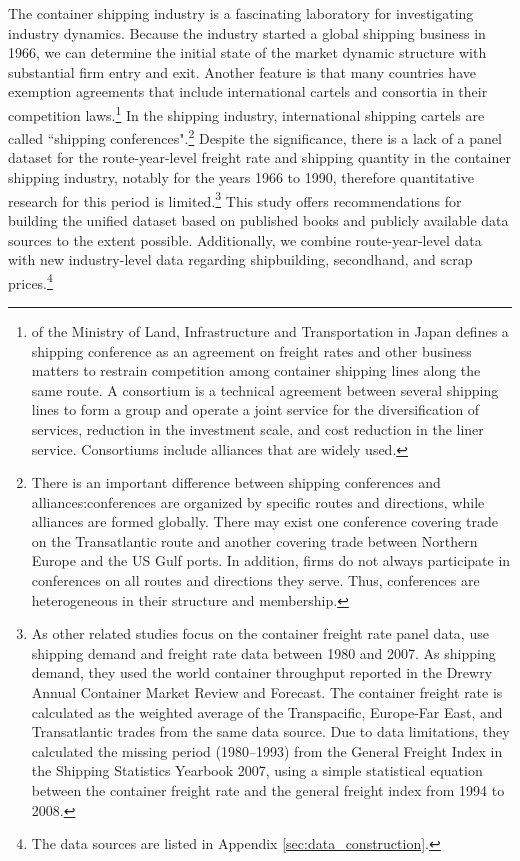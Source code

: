 \documentclass[11pt]{article}
\begin{document}
The container shipping industry is a fascinating laboratory for investigating industry dynamics. Because the industry started a global shipping business in 1966, we can determine the initial state of the market dynamic structure with substantial firm entry and exit. Another feature is that many countries have exemption agreements that include international cartels and consortia in their competition laws.\footnote{\cite{Anteitekina_kokusaikaijouyusoukakuhonotameno_kaijiseisakuno_arikatanitsuite2007} of the Ministry of Land, Infrastructure and Transportation in Japan defines a shipping conference as an agreement on freight rates and other business matters to restrain competition among container shipping lines along the same route. A consortium is a technical agreement between several shipping lines to form a group and operate a joint service for the diversification of services, reduction in the investment scale, and cost reduction in the liner service. Consortiums include alliances that are widely used. } In the shipping industry, international shipping cartels are called  ``shipping conferences".\footnote{There is an important difference between shipping conferences and alliances:conferences are organized by specific routes and directions, while alliances are formed globally. There may exist one conference covering trade on the Transatlantic route and another covering trade between Northern Europe and the US Gulf ports. In addition, firms do not always participate in conferences on all routes and directions they serve. Thus, conferences are heterogeneous in their structure and membership.} Despite the significance, there is a lack of a panel dataset for the route-year-level freight rate and shipping quantity in the container shipping industry, notably for the years 1966 to 1990, therefore  quantitative research for this period is limited.\footnote{As other related studies focus on the container freight rate panel data, \cite{luo2009econometric} use shipping demand and freight rate data between 1980 and 2007. As shipping demand, they used the world container throughput reported in the Drewry Annual Container Market Review and Forecast. The container freight rate is calculated as the weighted average of the Transpacific, Europe-Far East, and Transatlantic trades from the same data source. Due to data limitations, they calculated the missing period (1980–1993) from the General Freight Index in the Shipping Statistics Yearbook 2007, using a simple statistical equation between the container freight rate and the general freight index from 1994 to 2008.} This study offers recommendations for building the unified dataset based on published books and publicly available data sources to the extent possible. Additionally, we combine route-year-level data with new industry-level data regarding shipbuilding, secondhand, and scrap prices.\footnote{The data sources are listed in Appendix \ref{sec:data_construction}.} 
\end{document}
